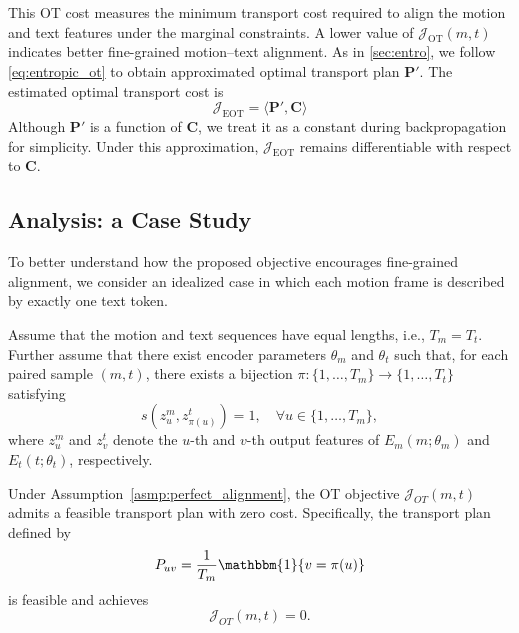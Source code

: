 This OT cost measures the minimum transport cost required to align the motion and text features under the marginal constraints.
A lower value of $\mathcal{J}_{\mathrm{OT}}(m,t)$ indicates better fine-grained motion--text alignment. As in \cref{sec:entro}, we follow \cref{eq:entropic_ot} to obtain approximated optimal transport plan $\mathbf{P}'$. The estimated optimal transport cost is 
\begin{equation}
\label{eq:eot}
\mathcal{J}_{\mathrm{EOT}} = \langle \mathbf{P}',\mathbf{C}\rangle
\end{equation}
Although $\mathbf{P}'$ is a function of $\mathbf{C}$, we treat it as a constant during backpropagation for simplicity. Under this approximation, $\mathcal{J}_{\mathrm{EOT}}$ remains differentiable with respect to $\mathbf{C}$.


\subsection{Analysis: a Case Study}
\label{sec:case}
To better understand how the proposed objective encourages fine-grained alignment, we consider an idealized case in which each motion frame is described by exactly one text token.

\begin{assumption}
\label{asmp:perfect_alignment}
Assume that the motion and text sequences have equal lengths, i.e., $T_m=T_t$.
Further assume that there exist encoder parameters $\theta_m$ and $\theta_t$ such that, for each paired sample $(m,t)$, there exists a bijection
$\pi:\{1,\ldots,T_m\}\rightarrow\{1,\ldots,T_t\}$ satisfying
\begin{equation}
s\!\left(z^m_u,z^t_{\pi(u)}\right)=1,
\quad \forall u\in\{1,\ldots,T_m\},
\end{equation}
where $z^m_u$ and $z^t_v$ denote the $u$-th and $v$-th output features of $E_m(m;\theta_m)$ and $E_t(t;\theta_t)$, respectively.
\end{assumption}

\begin{theorem}
\label{thm:zero_ot}
Under Assumption~\ref{asmp:perfect_alignment}, the OT objective $\mathcal{J}_{OT}(m,t)$ admits a feasible transport plan with zero cost. Specifically, the transport plan defined by
\begin{equation}
P_{uv}=\frac{1}{T_m}\mathbbm{1}\{v=\pi(u)\}
\end{equation}
is feasible and achieves
\begin{equation}
\mathcal{J}_{OT}(m,t)=0.
\end{equation}
\end{theorem}

